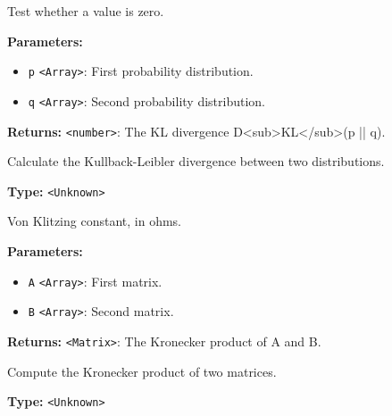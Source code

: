 \documentclass[12pt,a4paper]{article}
\begin{document}
\noindent Test whether a value is zero.

\vspace{5mm}
\noindent {}


\noindent \textbf{Parameters:}
\begin{itemize}
  \item \texttt{p} \texttt{<Array>}: First probability distribution.
  \item \texttt{q} \texttt{<Array>}: Second probability distribution.
\end{itemize}

\noindent \textbf{Returns:} \texttt{<number>}: The KL divergence D<sub>KL</sub>(p || q).

\noindent Calculate the Kullback-Leibler divergence between two distributions.

\vspace{5mm}
\noindent {}\vspace{4mm}


\noindent \textbf{Type:} \texttt{<Unknown>}

\noindent Von Klitzing constant, in ohms.

\vspace{5mm}
\noindent {}


\noindent \textbf{Parameters:}
\begin{itemize}
  \item \texttt{A} \texttt{<Array>}: First matrix.
  \item \texttt{B} \texttt{<Array>}: Second matrix.
\end{itemize}

\noindent \textbf{Returns:} \texttt{<Matrix>}: The Kronecker product of A and B.

\noindent Compute the Kronecker product of two matrices.

\vspace{5mm}
\noindent {}\vspace{4mm}


\noindent \textbf{Type:} \texttt{<Unknown>}
\end{document}
